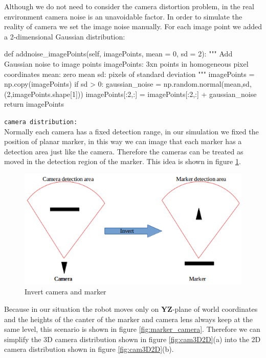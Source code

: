 Although we do not need to consider the camera distortion problem, in the real environment camera noise is an unavoidable factor. In order to simulate the reality of camera we set the image noise manually. For each image point we added a 2-dimensional Gaussian distribution:
\begin{python}
    def addnoise_imagePoints(self, imagePoints, mean = 0, sd = 2):
        """ Add Gaussian noise to image points
        imagePoints: 3xn points in homogeneous pixel coordinates
        mean: zero mean
        sd: pixels of standard deviation
        """
        imagePoints = np.copy(imagePoints)
        if sd > 0:
            gaussian_noise = np.random.normal(mean,sd,(2,imagePoints.shape[1]))
            imagePoints[:2,:] = imagePoints[:2,:] + gaussian_noise
        return imagePoints
\end{python}

\texttt{camera distribution:}\\
Normally each camera has a fixed detection range, in our simulation we fixed the position of planar marker, in this way we can image that each marker has a detection area just like the camera. Therefore the cameras can be treated as moved in the detection region of the marker. This idea is shown in figure \ref{fig:cm_invert}.
\begin{figure}[H]
\centering
\includegraphics[scale=0.7]{./fig/cm_invert.png}
\caption{Invert camera and marker}  
\label{fig:cm_invert}
\end{figure}

Because in our situation the robot moves only on \textbf{YZ}-plane of world coordinates and the heights of the canter of the marker and camera lens always keep at the same level, this scenario is shown in figure \ref{fig:marker_camera}. Therefore we can simplify the 3D camera distribution shown in figure \ref{fig:cam3D2D}(a) into the 2D camera distribution shown in figure \ref{fig:cam3D2D}(b). 

